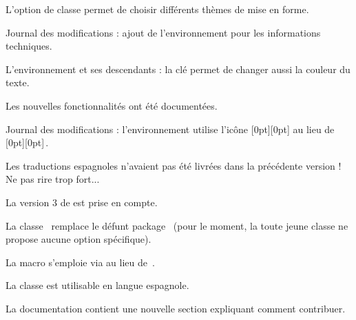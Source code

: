 \begin{tdocnew}
    \item L'option de classe  permet de choisir différents thèmes de mise en forme.

    \item Journal des modifications : ajout de l'environnement  pour les informations techniques.

    \item L'environnement  et ses descendants : la clé  permet de changer aussi la couleur du texte.

    \item Les nouvelles fonctionnalités ont été documentées.
\end{tdocnew}


\begin{tdocupdate}
    \item Journal des modifications : l'environnement  utilise l'icône
    \raisebox{0pt}[0pt][0pt]{}
    au lieu de
    \raisebox{0pt}[0pt][0pt]{\fbox{\faMagic}}\,.
\end{tdocupdate}


\begin{tdocfix}
    \item Les traductions espagnoles n'avaient pas été livrées dans la précédente version ! Ne pas rire trop fort...
\end{tdocfix}

\tdocsep




\begin{tdoctech}[version = 1.5.0, date = 2024-10-19]
    \item La version 3 de  est prise en compte.
\end{tdoctech}

\begin{tdocbreak}
    \item La classe \thisproj\ remplace le défunt package \thisproj\ (pour le moment, la toute jeune classe ne propose aucune option spécifique).

    \item La macro  s'emploie via  au lieu de \,.
\end{tdocbreak}


\begin{tdocnew}
    \item La classe est utilisable en langue espagnole.

    \item La documentation contient une nouvelle section expliquant comment contribuer.
\end{tdocnew}


